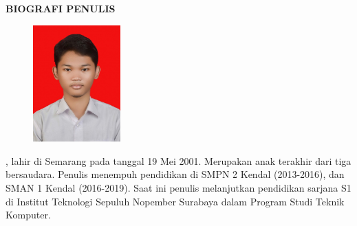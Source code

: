 \begin{center}
  \Large
  \textbf{BIOGRAFI PENULIS}
\end{center}


\vspace{2ex}

\begin{figure}
  \centering
  \vspace{-3ex}
  \includegraphics[width=0.3\textwidth]{gambar/foto-biodata.jpg}
  \vspace{-4ex}
\end{figure}

\name{}, lahir di Semarang pada tanggal 19 Mei 2001. Merupakan anak terakhir dari tiga bersaudara. Penulis menempuh pendidikan di SMPN 2 Kendal (2013-2016), dan SMAN 1 Kendal (2016-2019). Saat ini penulis melanjutkan pendidikan sarjana S1 di Institut Teknologi Sepuluh Nopember Surabaya dalam Program Studi Teknik Komputer.
